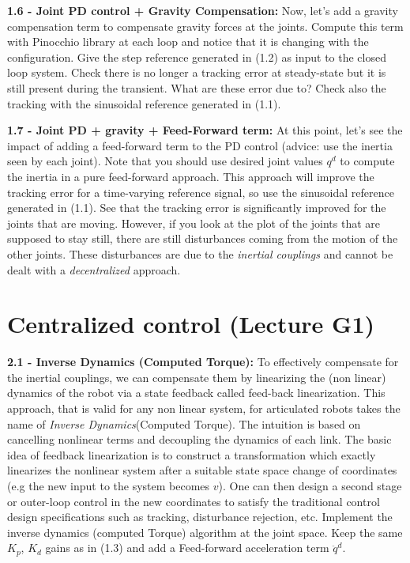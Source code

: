 \documentclass[11pt]{article}
\begin{document}
\quad

\noindent
\textbf{1.6 - Joint PD control + Gravity Compensation:}
Now, let's add a gravity compensation term to compensate gravity forces at the joints. 
Compute this term with Pinocchio library at each loop and notice that it is changing with the configuration. 
Give the step reference generated in (1.2) as input to the closed loop system. 
Check there is no longer a  tracking error at steady-state but it is still present during the transient. What are these error due to?
Check also the tracking with the sinusoidal reference generated in (1.1).

\quad

\noindent
\textbf{1.7 - Joint  PD + gravity + Feed-Forward term:}
At this point, let's see the impact of adding a feed-forward term to the PD control (advice: use the inertia seen by each joint). Note that you should use desired joint values $q^d$ to compute the inertia in a pure feed-forward approach. This approach will improve the tracking error for a time-varying reference signal, so use the sinusoidal reference generated in (1.1).  See that the tracking error is significantly improved for the joints that are moving. However, if you look at the plot of the joints that are supposed to stay still, there are still disturbances coming from the motion of the other joints. These disturbances are  due to the \textit{inertial couplings} and cannot be dealt with a \textit{decentralized} approach.

\quad

\section{Centralized control (Lecture G1)}

\noindent
\textbf{2.1 - Inverse Dynamics (Computed Torque):}
To effectively compensate for the inertial couplings, we can compensate them by 
linearizing the (non linear) dynamics of the robot via a state feedback called feed-back linearization. 
This approach, that is valid for any non linear system, for articulated robots takes the name of \textit{Inverse Dynamics}(Computed Torque). 
The intuition is based on cancelling nonlinear terms and decoupling the dynamics of each link.
The basic idea of feedback linearization is to construct a transformation which exactly linearizes the
nonlinear system after a suitable state space change of coordinates (e.g the new input to the system becomes $v$).
 One can then design a second stage or
outer-loop control in the new coordinates to satisfy the traditional control design specifications such as tracking,
disturbance rejection, etc.
Implement the inverse dynamics  (computed Torque) algorithm at the joint space. Keep the same $K_p$, $K_d$ gains as in (1.3) and add a Feed-forward acceleration term $\ddot{q}^d$. 
\end{document}
